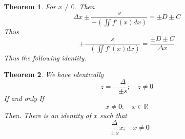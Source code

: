 \documentclass[11pt, a4paper]{article}
\theoremstyle{plain}
\newtheorem{theorem}{Theorem}[section]
\theoremstyle{definition}
\theoremstyle{remark}
\begin{document}
\begin{theorem}
For $x\neq 0$. Then
\begin{equation}
  \Delta x \pm \frac{s}{-(\iint f'(x) dx)} = \pm D \pm C 
\end{equation}
Thus
\begin{equation}
  \pm \frac{s}{-(\iint f'(x) dx)} = \frac{\pm D \pm C}{\Delta x }
\end{equation}
Thus the following identity.
\end{theorem}

\begin{theorem}
We have identically
\begin{equation}
  z = -\frac{\Delta}{\pm s}; \quad z \neq 0
\end{equation}
If and only If
\begin{equation}
  x \neq 0; \quad x \in \mathbb{R}
\end{equation}
Then. There is an identity of $x$ such that
\begin{equation}
  -\frac{\Delta}{\pm s}x; \quad x \neq 0
\end{equation}
\end{theorem}
\end{document}
